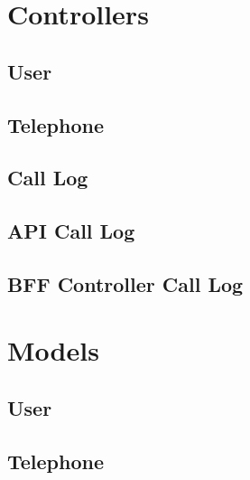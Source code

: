 \chapter{Controllers}\label{bijlage_controllers}
\section{User}\label{bij_con_user}


\section{Telephone}\label{bij_con_telephone}


\section{Call Log}\label{bij_con_calllog}


\section{API Call Log}\label{bij_api_con_call_log}


\section{BFF Controller Call Log}\label{bij_ms_con_call_log}


\chapter{Models}\label{bijlage_models}
\section{User}\label{bij_model_user}


\section{Telephone}\label{bij_model_telephone}


